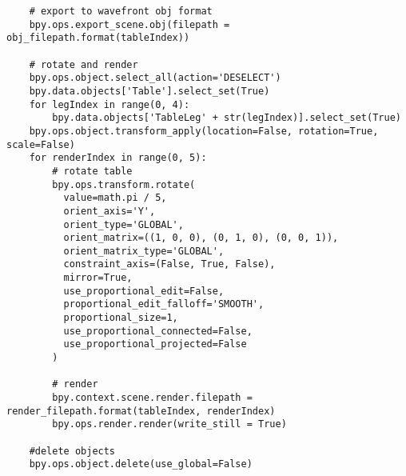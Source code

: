 \begin{lstlisting}
    # export to wavefront obj format
    bpy.ops.export_scene.obj(filepath = obj_filepath.format(tableIndex))

    # rotate and render
    bpy.ops.object.select_all(action='DESELECT')
    bpy.data.objects['Table'].select_set(True)
    for legIndex in range(0, 4):
        bpy.data.objects['TableLeg' + str(legIndex)].select_set(True)
    bpy.ops.object.transform_apply(location=False, rotation=True, scale=False)
    for renderIndex in range(0, 5):
        # rotate table
        bpy.ops.transform.rotate(
          value=math.pi / 5,
          orient_axis='Y',
          orient_type='GLOBAL',
          orient_matrix=((1, 0, 0), (0, 1, 0), (0, 0, 1)),
          orient_matrix_type='GLOBAL',
          constraint_axis=(False, True, False),
          mirror=True,
          use_proportional_edit=False,
          proportional_edit_falloff='SMOOTH',
          proportional_size=1,
          use_proportional_connected=False,
          use_proportional_projected=False
        )

        # render
        bpy.context.scene.render.filepath = render_filepath.format(tableIndex, renderIndex)
        bpy.ops.render.render(write_still = True)

    #delete objects
    bpy.ops.object.delete(use_global=False)
\end{lstlisting}
